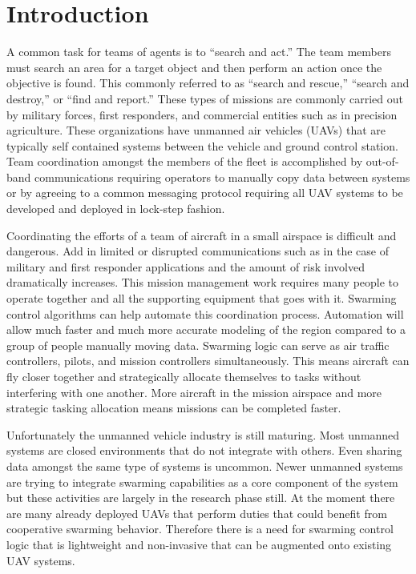 \chapter{Introduction}
A common task for teams of agents is to ``search and act.''  The team members must search an area for a target object and then perform an action once the objective is found.  This commonly referred to as ``search and rescue,'' ``search and destroy,'' or ``find and report.''  These types of missions are commonly carried out by military forces, first responders, and commercial entities such as in precision agriculture.  These organizations have unmanned air vehicles (UAVs) that are typically self contained systems between the vehicle and ground control station.  Team coordination amongst the members of the fleet is accomplished by out-of-band communications requiring operators to manually copy data between systems or by agreeing to a common messaging protocol requiring all UAV systems to be developed and deployed in lock-step fashion.  

Coordinating the efforts of a team of aircraft in a small airspace is difficult and dangerous.  Add in limited or disrupted communications such as in the case of military and first responder applications and the amount of risk involved dramatically increases.  This mission management work requires many people to operate together and all the supporting equipment that goes with it. Swarming control algorithms can help automate this coordination process.  Automation will allow much faster and much more accurate modeling of the region compared to a group of people manually moving data.  Swarming logic can serve as air traffic controllers, pilots, and mission controllers simultaneously.  This means aircraft can fly closer together and strategically allocate themselves to tasks without interfering with one another.  More aircraft in the mission airspace and more strategic tasking allocation means missions can be completed faster.

Unfortunately the unmanned vehicle industry is still maturing.  Most unmanned systems are closed environments that do not integrate with others.  Even sharing data amongst the same type of systems is uncommon.  Newer unmanned systems are trying to integrate swarming capabilities as a core component of the system but these activities are largely in the research phase still.  At the moment there are many already deployed UAVs that perform duties that could benefit from cooperative swarming behavior.  Therefore there is a need for swarming control logic that is lightweight and non-invasive that can be augmented onto existing UAV systems.


